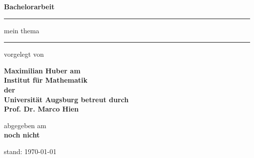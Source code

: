 \begin{titlepage}
  \thispagestyle{empty}
  \newcommand{\Rule}{\rule{\textwidth}{1mm}}
  \begin{center}\sffamily\bfseries
    \LARGE Bachelorarbeit
    \vfill
    \Rule
    \vspace{5mm}
    \Huge
    mein thema
    \vspace{1mm}
    \Rule
    \vfill
    \normalfont\sffamily\large vorgelegt von\par
    \bfseries\LARGE Maximilian Huber
    \vfill
    \normalfont\sffamily\large am\\
    \bfseries\Large Institut für Mathematik\\
    \normalfont\sffamily\large der\\
    \bfseries\Large Universität Augsburg
    \vfill
    \normalfont\sffamily\large betreut durch \\
    \bfseries\Large Prof. Dr. Marco Hien \par
    \vfill
    \normalfont\sffamily\large abgegeben am \\
    \bfseries\Large noch nicht\\
  \end{center}
  \ifnum{}
    \begin{center}
      stand: \today
    \end{center}
  \fi
\end{titlepage}
